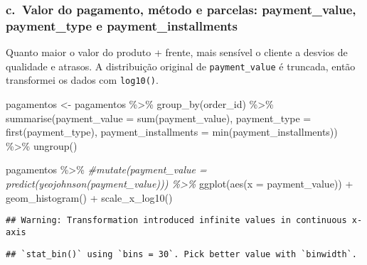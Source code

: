 \documentclass[
]{article}
\newenvironment{Shaded}{\begin{snugshade}}{\end{snugshade}}
\newcommand{\AttributeTok}[1]{\textcolor[rgb]{0.77,0.63,0.00}{#1}}
\newcommand{\CommentTok}[1]{\textcolor[rgb]{0.56,0.35,0.01}{\textit{#1}}}
\newcommand{\FunctionTok}[1]{\textcolor[rgb]{0.00,0.00,0.00}{#1}}
\newcommand{\NormalTok}[1]{#1}
\newcommand{\OtherTok}[1]{\textcolor[rgb]{0.56,0.35,0.01}{#1}}
\newcommand{\SpecialCharTok}[1]{\textcolor[rgb]{0.00,0.00,0.00}{#1}}
\begin{document}
\hypertarget{c.-valor-do-pagamento-muxe9todo-e-parcelas-payment_value-payment_type-e-payment_installments}{%
\subsubsection{c.~Valor do pagamento, método e parcelas: payment\_value,
payment\_type e
payment\_installments}\label{c.-valor-do-pagamento-muxe9todo-e-parcelas-payment_value-payment_type-e-payment_installments}}

Quanto maior o valor do produto + frente, mais sensível o cliente a
desvios de qualidade e atrasos. A distribuição original de
\texttt{payment\_value} é truncada, então transformei os dados com
\texttt{log10()}.

\begin{Shaded}
\begin{Highlighting}[]
\NormalTok{pagamentos }\OtherTok{\textless{}{-}}\NormalTok{ pagamentos }\SpecialCharTok{\%\textgreater{}\%}
  \FunctionTok{group\_by}\NormalTok{(order\_id) }\SpecialCharTok{\%\textgreater{}\%}
  \FunctionTok{summarise}\NormalTok{(}\AttributeTok{payment\_value =} \FunctionTok{sum}\NormalTok{(payment\_value), }
            \AttributeTok{payment\_type =} \FunctionTok{first}\NormalTok{(payment\_type),}
            \AttributeTok{payment\_installments =} \FunctionTok{min}\NormalTok{(payment\_installments)) }\SpecialCharTok{\%\textgreater{}\%}
  \FunctionTok{ungroup}\NormalTok{()}
\end{Highlighting}
\end{Shaded}

\begin{Shaded}
\begin{Highlighting}[]
\NormalTok{pagamentos }\SpecialCharTok{\%\textgreater{}\%}
  \CommentTok{\#mutate(payment\_value = predict(yeojohnson(payment\_value))) \%\textgreater{}\% }
  \FunctionTok{ggplot}\NormalTok{(}\FunctionTok{aes}\NormalTok{(}\AttributeTok{x =}\NormalTok{ payment\_value)) }\SpecialCharTok{+}
  \FunctionTok{geom\_histogram}\NormalTok{() }\SpecialCharTok{+} 
  \FunctionTok{scale\_x\_log10}\NormalTok{()}
\end{Highlighting}
\end{Shaded}

\begin{verbatim}
## Warning: Transformation introduced infinite values in continuous x-axis
\end{verbatim}

\begin{verbatim}
## `stat_bin()` using `bins = 30`. Pick better value with `binwidth`.
\end{verbatim}
\end{document}

